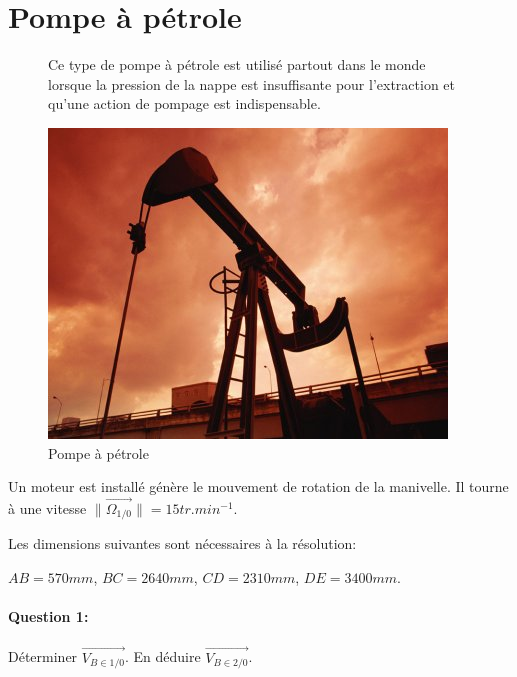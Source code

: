\section{Pompe à pétrole}

\begin{figure}[!h]
\begin{minipage}[c]{.6\linewidth}
Ce type de pompe à pétrole est utilisé partout dans le monde lorsque la pression de la nappe est insuffisante pour l'extraction et qu'une action de pompage est indispensable.
\end{minipage}
\hfill
\begin{minipage}[c]{.35\linewidth}
\begin{center}
\includegraphics[width=\linewidth]{img/pompe-petrole.jpg}
\caption{Pompe à pétrole}
\label{fig:image1}
\end{center}
\end{minipage}
\end{figure}

Un moteur est installé génère le mouvement de rotation de la manivelle. Il tourne à une vitesse $\|\overrightarrow{\Omega_{1/0}}\|=15 tr.min^{-1}$.

Les dimensions suivantes sont nécessaires à la résolution:

$AB = 570mm$, $BC = 2640mm$, $CD = 2310mm$, $DE = 3400mm$.

\paragraph{Question 1:} Déterminer $\overrightarrow{V_{B \in 1/0}}$. En déduire $\overrightarrow{V_{B \in 2/0}}$.

